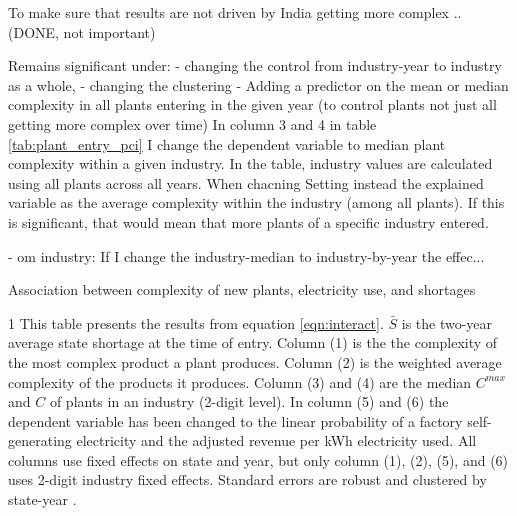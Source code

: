 \documentclass[11pt]{article}
\begin{document}
To make sure that results are not driven by India getting more complex .. (DONE, not important)

Remains significant under: 
 - changing the control from industry-year to industry as a whole,
 - changing the clustering
 - Adding a predictor on the mean or median complexity in all plants entering in the given year (to control plants not just all getting more complex over time)
In column 3 and 4 in table \ref{tab:plant_entry_pci} I change the dependent variable to median plant complexity within a given industry. In the table, industry values are calculated using all plants across all years. When chacning 
Setting instead the explained variable as the average complexity within the industry (among all plants). If this is significant, that would mean that more plants of a specific industry entered.

- om industry: If I change the industry-median to industry-by-year the effec...

\begin{table} 
	\begin{center}
		\begin{threeparttable}
			\caption{Association between complexity of new plants, electricity use, and shortages}
			\label{tab:entry_min}
			
			\begin{tablenotes} \footnotesize 
			\item[1] This table presents the results from equation \ref{eqn:interact}. $\bar{S}$ is the two-year average state shortage at the time of entry. Column (1) is the the complexity of the most complex product a plant produces. Column (2) is the weighted average complexity of the products it produces. Column (3) and (4) are the median $C^{max}$ and $C$ of plants in an industry (2-digit level). In column (5) and (6) the dependent variable has been changed to the linear probability of a factory self-generating electricity and the adjusted revenue per kWh electricity used. All columns use fixed effects on state and year, but only column (1), (2), (5), and (6) uses 2-digit industry fixed effects. Standard errors are robust and clustered by state-year .
			\end{tablenotes}
		\end{threeparttable}
	\end{center}
\end{table}   
\end{document}
